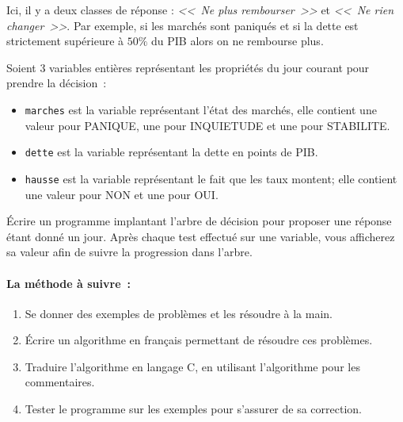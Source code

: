 Ici, il y a deux classes de réponse : \textit{<<~Ne plus rembourser~>>} et
\textit{<<~Ne rien changer~>>}.
Par exemple, si les marchés sont paniqués et si la dette est
strictement supérieure à $50\%$ du PIB alors on ne rembourse plus.



Soient 3 variables entières représentant les propriétés du jour
courant pour prendre la décision~:
  
\begin{itemize}
\item \verb|marches| est la variable représentant l'état des marchés, elle contient une valeur pour PANIQUE, une pour INQUIETUDE et
  une pour STABILITE.
\item \verb|dette| est la variable représentant la dette en points de
  PIB.
\item \verb|hausse| est la variable représentant le fait que les taux
  montent; elle contient une valeur pour
  NON et une pour OUI.
\end{itemize}

Écrire un programme  implantant l'arbre de décision pour proposer une
réponse étant donné un jour. Après chaque test effectué sur une
variable, vous afficherez sa valeur afin de suivre la progression dans
l'arbre. 



\paragraph{La méthode à suivre~:}
\begin{enumerate}
\item Se donner des exemples de problèmes et les résoudre à la main. 
\item Écrire un algorithme en français permettant de résoudre ces
  problèmes. 
\item Traduire l'algorithme en langage C, en utilisant l'algorithme
  pour les commentaires. 
\item Tester le programme sur les exemples pour s'assurer de sa
  correction.
\end{enumerate}

